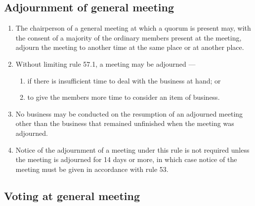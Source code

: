\documentclass[../constitution.tex]{subfiles}
\begin{document}
\hypertarget{adjournment-of-general-meeting}{%
\subsection{Adjournment of general meeting}\label{adjournment-of-general-meeting}}

\begin{enumerate}

\item The chairperson of a general meeting at which a quorum is present may, with the consent of a majority of the ordinary members present at the meeting, adjourn the meeting to another time at the same place or at another place.
\item Without limiting rule 57.1, a meeting may be adjourned ---

  \begin{enumerate}
  
  \item if there is insufficient time to deal with the business at hand; or
  \item to give the members more time to consider an item of business.
  \end{enumerate}
\item No business may be conducted on the resumption of an adjourned meeting other than the business that remained unfinished when the meeting was adjourned.
\item Notice of the adjournment of a meeting under this rule is not required unless the meeting is adjourned for 14 days or more, in which case notice of the meeting must be given in accordance with rule 53.
\end{enumerate}

\hypertarget{voting-at-general-meeting}{%
\subsection{Voting at general meeting}\label{voting-at-general-meeting}}
\end{document}
